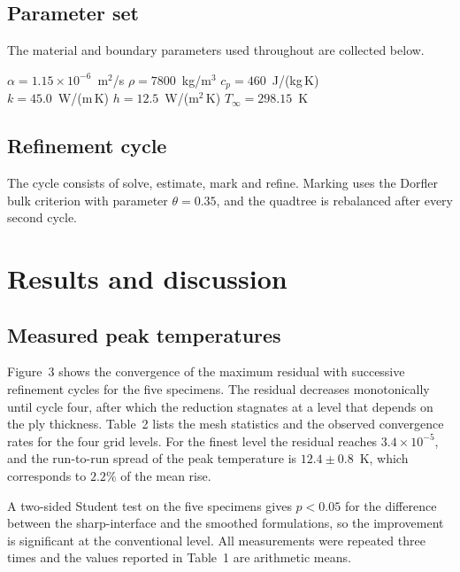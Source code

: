 \documentclass[11pt,a4paper]{article}
\begin{document}
\subsection{Parameter set}
The material and boundary parameters used throughout are collected below.
\begin{center}
\begin{minipage}{0.94\textwidth}\centering
$\alpha = 1.15\times10^{-6}$~m$^{2}$/s \qquad $\rho = 7800$~kg/m$^{3}$ \qquad $c_{p} = 460$~J/(kg\,K)\\[3pt]
$k = 45.0$~W/(m\,K) \qquad $h = 12.5$~W/(m$^{2}$\,K) \qquad $T_{\infty} = 298.15$~K
\end{minipage}
\end{center}

\subsection{Refinement cycle}
The cycle consists of solve, estimate, mark and refine. Marking uses the
Dorfler bulk criterion with parameter $\theta = 0.35$, and the quadtree is
rebalanced after every second cycle.

\section{Results and discussion}
\label{sec:results}
\subsection{Measured peak temperatures}
Figure~3 shows the convergence of the maximum residual with successive refinement
cycles for the five specimens. The residual decreases monotonically until cycle
four, after which the reduction stagnates at a level that depends on the ply
thickness. Table~2 lists the mesh statistics and the observed convergence rates
for the four grid levels. For the finest level the residual reaches
$3.4\times10^{-5}$, and the run-to-run spread of the peak temperature is
$12.4 \pm 0.8$~K, which corresponds to $2.2\%$ of the mean rise.

A two-sided Student test on the five specimens gives $p < 0.05$ for the
difference between the sharp-interface and the smoothed formulations, so the
improvement is significant at the conventional level. All measurements were
repeated three times and the values reported in Table~1 are arithmetic means.
\end{document}

